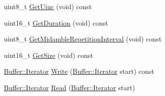\begin{DoxyCompactItemize}
\item 
uint8\+\_\+t \hyperlink{classns3_1_1OfdmUlMapIe_a5b70354d28bfc596902377facb2ef227}{Get\+Uiuc} (void) const 
\item 
uint16\+\_\+t \hyperlink{classns3_1_1OfdmUlMapIe_a2ad093a586185e3cb03a2b8684b2b19b}{Get\+Duration} (void) const 
\item 
uint8\+\_\+t \hyperlink{classns3_1_1OfdmUlMapIe_a8b1d1430f226e7aa178dbaf367155e56}{Get\+Midamble\+Repetition\+Interval} (void) const 
\item 
uint16\+\_\+t \hyperlink{classns3_1_1OfdmUlMapIe_ae5c795a7fe0d45e245f56adfc8311897}{Get\+Size} (void) const 
\item 
\hyperlink{classns3_1_1Buffer_1_1Iterator}{Buffer\+::\+Iterator} \hyperlink{classns3_1_1OfdmUlMapIe_af455e0a2ab5c3d4a4a76d2ead8e10b64}{Write} (\hyperlink{classns3_1_1Buffer_1_1Iterator}{Buffer\+::\+Iterator} start) const 
\item 
\hyperlink{classns3_1_1Buffer_1_1Iterator}{Buffer\+::\+Iterator} \hyperlink{classns3_1_1OfdmUlMapIe_ad5e4a18fdd86c590156ceab3a2d63ca8}{Read} (\hyperlink{classns3_1_1Buffer_1_1Iterator}{Buffer\+::\+Iterator} start)
\end{DoxyCompactItemize}
